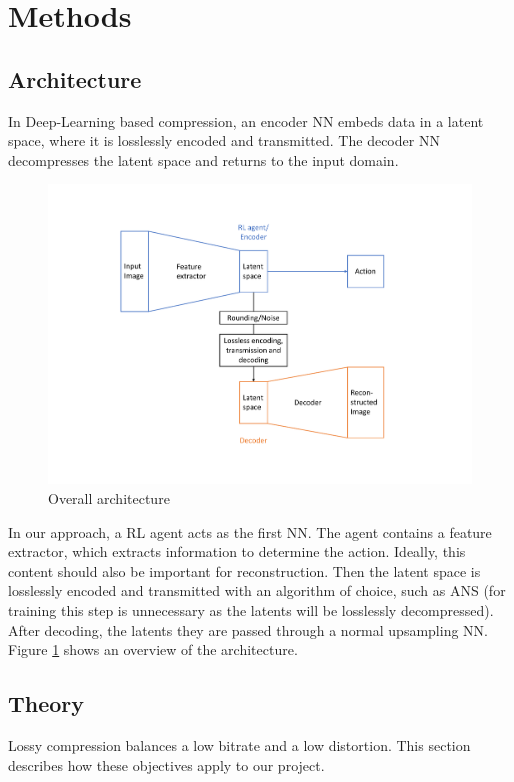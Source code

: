 \section{Methods}

\subsection{Architecture}\label{methods:Architecture}
    In Deep-Learning based compression, an encoder NN embeds data in a latent space, where it is losslessly encoded and transmitted. The decoder NN decompresses the latent space and returns to the input domain.

    \begin{figure}[H]
        \centering
        \includegraphics[width=\linewidth]{images/architecture.pdf}
        \setlength{\belowcaptionskip}{5pt}
        \caption{Overall architecture}
        \label{fig:Architecture}
    \end{figure}

    In our approach, a RL agent acts as the first
    NN. The agent contains a feature extractor, which
    extracts information to determine
    the action. Ideally, this content should also be important
    for reconstruction. Then the latent space is losslessly encoded and
    transmitted with an algorithm of choice, such as ANS (for training this
    step is unnecessary as the latents will be losslessly decompressed). After decoding, the latents they are passed through a normal upsampling NN.
    Figure \ref{fig:Architecture} shows an overview of the architecture.

\subsection{Theory}
    Lossy compression balances a low bitrate and a low distortion.
    This section describes how these objectives apply to our project.


